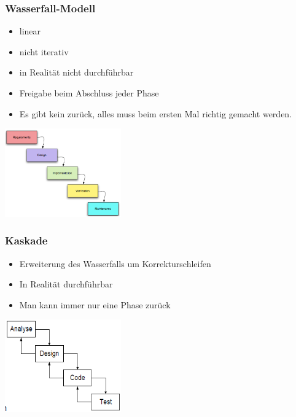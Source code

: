 \subsubsection{Wasserfall-Modell}
\begin{minipage}{10cm}
	\begin{itemize}
		\item linear
		\item nicht iterativ
		\item in Realität nicht durchführbar
		\item Freigabe beim Abschluss jeder Phase
		\item Es gibt kein zurück, alles muss beim ersten Mal richtig gemacht werden. 
	\end{itemize}
\end{minipage}
\begin{minipage}{5cm}
	\includegraphics[width=5cm]{images/wasserfall_modell.png}
\end{minipage}
	
\subsubsection{Kaskade}
	\begin{minipage}{10cm}
		\begin{itemize}
			\item Erweiterung des Wasserfalls um Korrekturschleifen
			\item In Realität durchführbar
			\item Man kann immer nur eine Phase zurück
		\end{itemize}
	\end{minipage}
	\begin{minipage}{5cm}
	\includegraphics[width=5cm]{images/kaskade.png}	
	\end{minipage}

